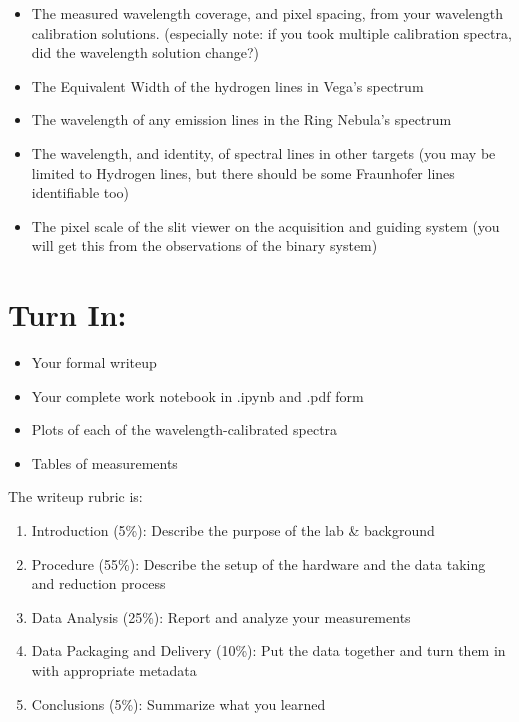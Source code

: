 \documentclass[11pt]{article}
\begin{document}
\begin{itemize}
    \item The measured wavelength coverage, and pixel spacing, from your wavelength calibration solutions.
        (especially note: if you took multiple calibration spectra, did the wavelength solution change?)
    \item The Equivalent Width of the hydrogen lines in Vega's spectrum
    \item The wavelength of any emission lines in the Ring Nebula's spectrum
    \item The wavelength, and identity, of spectral lines in other targets (you may be limited to Hydrogen lines, but there should be some Fraunhofer lines identifiable too)
    \item The pixel scale of the slit viewer on the acquisition and guiding system (you will get this from the observations of the binary system)
\end{itemize}


\section{Turn In:}
\begin{itemize}
    \item Your formal writeup
    \item Your complete work notebook in .ipynb and .pdf form
    \item Plots of each of the wavelength-calibrated spectra
    \item Tables of measurements
\end{itemize}


The writeup rubric is:
\begin{enumerate}
    \item Introduction (5\%): Describe the purpose of the lab \& background
    \item Procedure (55\%): Describe the setup of the hardware and the data taking and reduction process
    \item Data Analysis (25\%):  Report and analyze your measurements
    \item Data Packaging and Delivery (10\%): Put the data together and turn them in with appropriate metadata
    \item Conclusions (5\%): Summarize what you learned
\end{enumerate}
\end{document}
